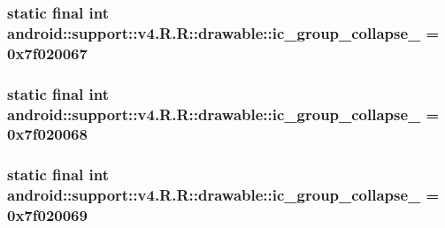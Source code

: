 \hypertarget{classandroid_1_1support_1_1v4_1_1_r_1_1drawable_8a02b92741be9f6f8666c0cd8fd93d34}{
\subsubsection[{ic\_\-group\_\-collapse\_\-08}]{\setlength{\rightskip}{0pt plus 5cm}static final int android::support::v4.R.R::drawable::ic\_\-group\_\-collapse\_ = 0x7f020067}}
\label{classandroid_1_1support_1_1v4_1_1_r_1_1drawable_8a02b92741be9f6f8666c0cd8fd93d34}


\hypertarget{classandroid_1_1support_1_1v4_1_1_r_1_1drawable_ff2877f3216221aff0569e951bdeba29}{
\subsubsection[{ic\_\-group\_\-collapse\_\-09}]{\setlength{\rightskip}{0pt plus 5cm}static final int android::support::v4.R.R::drawable::ic\_\-group\_\-collapse\_ = 0x7f020068}}
\label{classandroid_1_1support_1_1v4_1_1_r_1_1drawable_ff2877f3216221aff0569e951bdeba29}


\hypertarget{classandroid_1_1support_1_1v4_1_1_r_1_1drawable_7867961cd80cd9ee43825ad21c920d68}{
\subsubsection[{ic\_\-group\_\-collapse\_\-10}]{\setlength{\rightskip}{0pt plus 5cm}static final int android::support::v4.R.R::drawable::ic\_\-group\_\-collapse\_ = 0x7f020069}}
\label{classandroid_1_1support_1_1v4_1_1_r_1_1drawable_7867961cd80cd9ee43825ad21c920d68}


